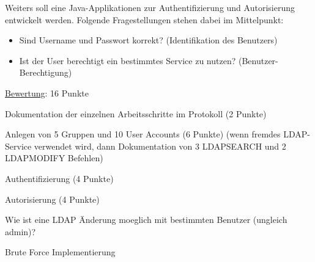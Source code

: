 Weiters soll eine Java-Applikationen zur Authentifizierung und Autorisierung entwickelt werden. Folgende Fragestellungen stehen dabei im Mittelpunkt:

\begin{itemize}
\item Sind Username und Passwort korrekt?
(Identifikation des Benutzers)
\item Ist der User berechtigt ein bestimmtes Service zu nutzen?
(Benutzer-Berechtigung)
\end{itemize}
\newpage

\uline{Bewertung}: 16 Punkte

\begin{list}{-}
\item Dokumentation der einzelnen Arbeitsschritte im Protokoll (2 Punkte)
\item Anlegen von 5 Gruppen und 10 User Accounts (6 Punkte)
(wenn fremdes LDAP-Service verwendet wird, dann Dokumentation von 3 LDAPSEARCH und 2 LDAPMODIFY Befehlen)
\item Authentifizierung (4 Punkte)
\item Autorisierung (4 Punkte)
\item Wie ist eine LDAP Änderung moeglich mit bestimmten Benutzer (ungleich admin)?
\item Brute Force Implementierung
\end{list}

\clearpage
